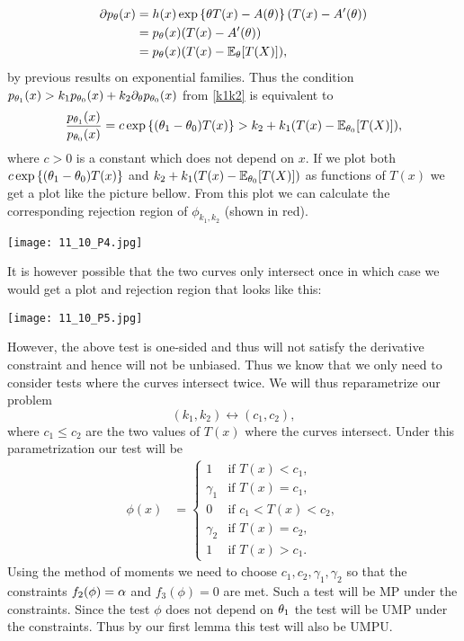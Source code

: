 \begin{align*} 
    \partial p_{\theta}(x)& = h(x)\exp\left\{{\theta} T(x)-A({\theta})\right\}(T(x)-A'({\theta}))\\
    &=p_{\theta}(x)(T(x)-A'({\theta}))\\
    &=p_{\theta}(x)(T(x)-{\mathbb{E}}_{\theta}[T(X)]),
\end{align*}
by previous results on exponential families. Thus the condition $p_{{\theta}_1}(x)>k_1p_{{\theta}_0}(x)+k_2\partial_{\theta} p_{{\theta}_0}(x)$ from \eqref{k1k2} is equivalent to
\[\frac{p_{{\theta}_1}(x)}{p_{{\theta}_0}(x)}=c\exp\left\{({\theta}_1-{\theta}_0)T(x)\right\} > k_2+k_1(T(x)-{\mathbb{E}}_{{\theta}_0}[T(X)]), \]
where $c>0$ is a constant which does not depend on $x$. If we plot both $c\exp\left\{({\theta}_1-{\theta}_0)T(x)\right\}$ and $k_2+k_1(T(x)-{\mathbb{E}}_{{\theta}_0}[T(X)])$ as functions of $T(x)$ we get a plot like the picture bellow. From this plot we can calculate the corresponding rejection region of $\phi_{k_1,k_2}$ (shown in red).

\begin{center}
\texttt{[image: 11\_10\_P4.jpg]}
\end{center}

It is however possible that the two curves only intersect once in which case we would get a plot and rejection region that looks like this:

\begin{center}
    \texttt{[image: 11\_10\_P5.jpg]}
\end{center}
However, the above test is one-sided and thus will not satisfy the derivative constraint and hence will not be unbiased. Thus we know that we only need to consider tests where the curves intersect twice. We will thus reparametrize our problem 
\[(k_1,k_2) \longleftrightarrow (c_1,c_2), \]
where $c_1 \le c_2$ are the two values of $T(x)$ where the curves intersect. Under this parametrization our test will be
\begin{align*}
    \phi(x) & =\begin{cases}
        1 & \text{if } T(x) < c_1,\\
        \gamma_1 & \text{if } T(x) = c_1,\\
        0 & \text{if } c_1 < T(x) < c_2,\\
        \gamma_2 & \text{if } T(x) = c_2,\\
        1 & \text{if } T(x) > c_1.
    \end{cases}
\end{align*}
Using the method of moments we need to choose $c_1,c_2,\gamma_1,\gamma_2$ so that the constraints $f_2(\phi)={\alpha}$ and $f_3(\phi)=0$ are met. Such a test will be MP under the constraints. Since the test $\phi$ does not depend on ${\theta}_1$ the test will be UMP under the constraints. Thus by our first lemma this test will also be UMPU. 
